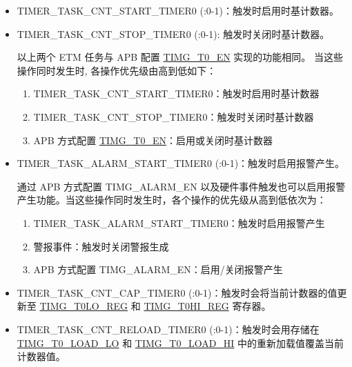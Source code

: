 \documentclass[main\_\_CN.tex]{subfiles}
\begin{document}
\begin{itemize}
    
\item TIMER\_TASK\_CNT\_START\_TIMER0 (:0-1)：触发时启用时基计数器。
\item TIMER\_TASK\_CNT\_STOP\_TIMER0 (:0-1): 触发时关闭时基计数器。

\begin{tiplisting}
以上两个 ETM 任务与 APB 配置 \hyperref[fielddesc:TIMGTXEN]{TIMG\_T0\_EN} 实现的功能相同。 当这些操作同时发生时, 各操作优先级由高到低如下：

\begin{enumerate}
    \item TIMER\_TASK\_CNT\_START\_TIMER0：触发时启用时基计数器
    \item TIMER\_TASK\_CNT\_STOP\_TIMER0：触发时关闭时基计数器
    \item APB 方式配置 \hyperref[fielddesc:TIMGTXEN]{TIMG\_T0\_EN}：启用或关闭时基计数器
\end{enumerate}
\end{tiplisting}

\item TIMER\_TASK\_ALARM\_START\_TIMER0 (:0-1)：触发时启用报警产生。

\begin{tiplisting}
通过 APB 方式配置 TIMG\_ALARM\_EN 以及硬件事件触发也可以启用报警产生功能。当这些操作同时发生时，各个操作的优先级从高到低依次为：

\begin{enumerate}
    \item TIMER\_TASK\_ALARM\_START\_TIMER0：触发时启用报警产生
    \item 警报事件：触发时关闭警报生成
    \item APB 方式配置 TIMG\_ALARM\_EN：启用/关闭报警产生
\end{enumerate}
\end{tiplisting}


\item TIMER\_TASK\_CNT\_CAP\_TIMER0 (:0-1)：触发时会将当前计数器的值更新至 \hyperref[regdesc:TIMGTXLOREG]{TIMG\_T0LO\_REG} 和 \hyperref[regdesc:TIMGTXHIREG]{TIMG\_T0HI\_REG} 寄存器。 
\item TIMER\_TASK\_CNT\_RELOAD\_TIMER0 (:0-1)：触发时会用存储在 \hyperref[fielddesc:TIMGTXLOADLO]{TIMG\_T0\_LOAD\_LO} 和 \hyperref[fielddesc:TIMGTXLOADHI]{TIMG\_T0\_LOAD\_HI} 中的重新加载值覆盖当前计数器值。

\end{itemize}
\end{document}

